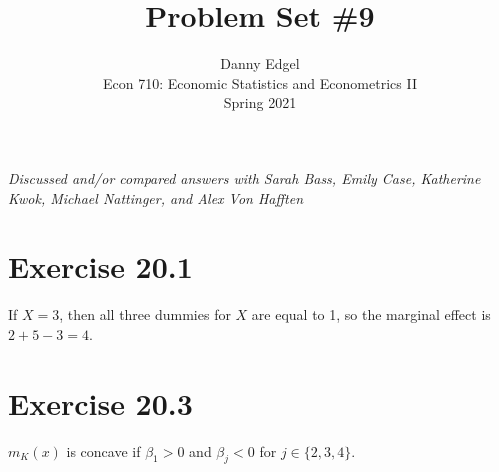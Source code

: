 \documentclass{article}
\begin{document}

\title{	Problem Set \#9 }
\author{ 	Danny Edgel 										\\ 
			Econ 710: Economic Statistics and Econometrics II	\\
			Spring 2021											\\
		}
\maketitle\thispagestyle{empty}


\noindent\textit{Discussed and/or compared answers with Sarah Bass, Emily Case, Katherine Kwok, Michael Nattinger, and Alex Von Hafften}

%


\section*{Exercise 20.1}
If $X=3$, then all three dummies for $X$ are equal to 1, so the marginal effect is ${2 + 5 -3 = 4}$.


\section*{Exercise 20.3}
$m_K(x)$ is concave if $\beta_1>0$ and $\beta_j<0$ for ${j\in\{2,3,4\}}$.

\pagebreak
\end{document}
